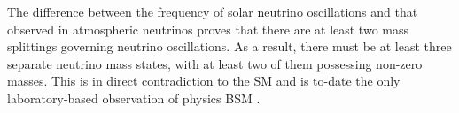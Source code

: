 The difference between the frequency of solar neutrino oscillations and that observed in atmospheric neutrinos proves that there are at least two mass splittings governing neutrino oscillations. As a result, there must be at least three separate neutrino mass states, with at least two of them possessing non-zero masses. This is in direct contradiction to the \gls{SM} and is to-date the only laboratory-based observation of physics \gls{BSM} \cite{SnowmassNeutrinoFrontierReport.pdf}.



